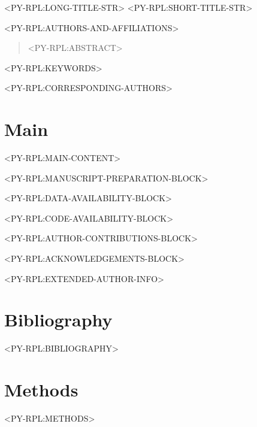 \documentclass[times, twoside]{rxiv_maker_style}
\begin{document}
<PY-RPL:LONG-TITLE-STR>
<PY-RPL:SHORT-TITLE-STR>

<PY-RPL:AUTHORS-AND-AFFILIATIONS>

\maketitle

\begin{abstract}

<PY-RPL:ABSTRACT>

\end{abstract}

<PY-RPL:KEYWORDS>

<PY-RPL:CORRESPONDING-AUTHORS>

\section*{Main}
<PY-RPL:MAIN-CONTENT>

\vspace{1em}

<PY-RPL:MANUSCRIPT-PREPARATION-BLOCK>

<PY-RPL:DATA-AVAILABILITY-BLOCK>

<PY-RPL:CODE-AVAILABILITY-BLOCK>

<PY-RPL:AUTHOR-CONTRIBUTIONS-BLOCK>

<PY-RPL:ACKNOWLEDGEMENTS-BLOCK>

\begin{exauthor}
<PY-RPL:EXTENDED-AUTHOR-INFO>
\end{exauthor}

\section*{Bibliography}
<PY-RPL:BIBLIOGRAPHY>

\section*{Methods}
<PY-RPL:METHODS>

\onecolumn
\newpage




\end{document}

